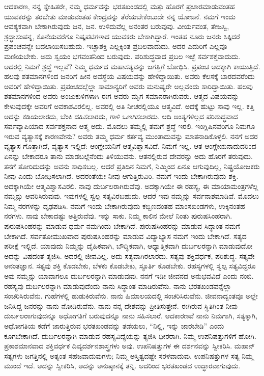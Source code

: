 ಆದಕಾರಣ, ನನ್ನ ಸ್ನೇಹಿತರೇ, ನಮ್ಮ ಧರ್ಮವನ್ನು ಭರತಖಂಡದಲ್ಲಿ ಮತ್ತು ಹೊರಗೆ ಪ್ರಚಾರಮಾಡುವಂತಹ ಯುವಕರನ್ನು ತರಬೇತು ಮಾಡುವಂತಹ ಕೇಂದ್ರವನ್ನು ತೆರೆಯಬೇಕೆಂಬುದೇ ನನ್ನ ಯೋಜನೆ. ನಮಗೆ ಇಂದು ಆವಶ್ಯಕವಾಗಿ ಬೇಕಾಗಿರುವುದು ಜನ, ಜನ. ಉಳಿದುವೆಲ್ಲ ಅನಂತರ ಬರುವುವು. ವೀರ್ಯವಂತ​, ತೇಜಸ್ವಿ, ಶ್ರದ್ಧಾಸಂಪನ್ನ, ಕೊನೆಯವರೆಗೂ ನಿಷ್ಕಪಟಿಗಳಾದ ಯುವಕರು ಬೇಕಾಗಿದ್ದಾರೆ. ಇಂತಹ ನೂರು ಜನರು ಸಿಕ್ಕಿದರೆ ಪ್ರಪಂಚವನ್ನೇ ಬದಲಾಯಿಸಬಹುದು. ಇಚ್ಛಾಶಕ್ತಿ ಎಲ್ಲಕ್ಕಿಂತ ಪ್ರಬಲವಾದುದು. ಅದರ ಎದುರಿಗೆ ಎಲ್ಲವೂ ಮಣಿಯಬೇಕು. ಅದು ಸ್ವಯಂ ಭಗವಂತನಿಂದ ಬರುವುದು. ಪರಿಶುದ್ಧವಾದ ಪ್ರಬಲ ಇಚ್ಛೆ ಸರ್ವಶಕ್ತವಾದುದು. ಅದರಲ್ಲಿ ನಿಮಗೆ ಶ್ರದ್ಧೆ ಇಲ್ಲವೆ? ನಿಮ್ಮ ಧರ್ಮದ ಮಹಾಸತ್ಯವನ್ನು ಜಗತ್ತಿಗೆ ಬೋಧಿಸಿ. ಪ್ರಪಂಚ ಅದಕ್ಕಾಗಿ ಕಾಯುತ್ತಿದೆ. ಹಲವು ಶತಮಾನಗಳಿಂದ ಜನರಿಗೆ ಹೀನ ಅವಸ್ಥೆಯ ವಿಷಯವನ್ನು ಹೇಳಿದ್ದಾಯಿತು. ಅವರು ಕೆಲಸಕ್ಕೆ ಬಾರದವರೆಂದು ಅವರಿಗೆ ಹೇಳಿದ್ದಾಯಿತು. ಪ್ರಪಂಚದಲ್ಲೆಲ್ಲಾ ಸಾಮಾನ್ಯರಿಗೆ ಅವರು ಮನುಷ್ಯರೇ ಅಲ್ಲವೆಂದು ಸಾರಿದ್ದಾಯಿತು. ಹಲವು ಶತಮಾನಗಳಿಂದ ಅವರು ಅಂಜುಕುಳಿಗಳಾಗಿ ಈಗ ಅವರು ಮೃಗ ಸಮಾನರಾಗಿರುವರು. ಆತ್ಮದ ವಿಷಯವನ್ನು ಕೇಳುವುದಕ್ಕೇ ಅವರಿಗೆ ಅವಕಾಶವಿರಲಿಲ್ಲ. ಅವರಲ್ಲಿ ಅತಿ ನೀಚರಲ್ಲಿಯೂ ಆತ್ಮವಿದೆ. ಅದಕ್ಕೆ ಹುಟ್ಟು ಸಾವು ಇಲ್ಲ. ಕತ್ತಿ ಅದನ್ನು ಕಡಿಯಲಾರದು, ಬೆಂಕಿ ದಹಿಸಲಾರದು, ಗಾಳಿ ಒಣಗಿಸಲಾರದು. ಆದಿ ಅಂತ್ಯಗಳಿಲ್ಲದ ಪರಿಶುದ್ಧವಾದ ಸರ್ವವ್ಯಾಪಿಯಾದ ಸರ್ವಶಕ್ತನಾದ ಆತ್ಮ ಅದು. ಮೊದಲು ತಮ್ಮಲ್ಲಿ ತಮಗೆ ಶ್ರದ್ಧೆ ಇರಲಿ. ಇಂಗ್ಲಿಷಿನವರಿಗೂ ನಿಮಗೂ ಇರುವ ವ್ಯತ್ಯಾಸಕ್ಕೆ ಕಾರಣವೇನು? ಅವರು ತಮ್ಮ ಧರ್ಮ ಕರ್ತವ್ಯ ಮುಂತಾದುವನ್ನು ಮಾತನಾಡಿಕೊಳ್ಳಲಿ. ನನಗೆ ಅದರ ವ್ಯತ್ಯಾಸ ಗೊತ್ತಾಗಿದೆ, ವ್ಯತ್ಯಾಸ ಇಲ್ಲಿದೆ: ಆಂಗ್ಲೇಯನಿಗೆ ಆತ್ಮವಿಶ್ವಾಸವಿದೆ. ನಿಮಗೆ ಇಲ್ಲ. ಆತ ಆಂಗ್ಲೇಯನಾದುದರಿಂದ ಏನನ್ನು ಬೇಕಾದರೂ ತಾನು ಮಾಡಬಲ್ಲೆನೆಂದು ತಿಳಿಯುವನು. ಆತನಲ್ಲಿರುವ ದೇವರನ್ನು ಅದು ಹೊರಗೆ ತರುವುದು. ತನಗೆ ತೋರಿದುದನ್ನು ಅವನು ಸಾಧಿಸಬಲ್ಲ. ಆದರೆ ಪ್ರತಿದಿನ ನಿಮಗೆ, ನಿಮ್ಮಿಂದ ಏನೂ ಆಗುವುದಿಲ್ಲ, ನಿಷ್ಪ್ರಯೋಜಕರು ನೀವು ಎಂದು ಬೋಧಿಸಲಾಗಿದೆ. ಅದರಂತೆಯೇ ನೀವು ಆಗುತ್ತಿರುವಿರಿ. ನಮಗೆ ಇಂದು ಬೇಕಾಗಿರುವುದು ಶಕ್ತಿ. ಅದಕ್ಕಾಗಿಯೇ ಆತ್ಮವಿಶ್ವಾಸವಿರಲಿ. ನಾವು ದುರ್ಬಲರಾಗಿರುವೆವು. ಅದಕ್ಕಾಗಿಯೇ ಈ ರಹಸ್ಯ, ಈ ಮಾಯಾಮಂತ್ರಗಳೆಲ್ಲ ನಮ್ಮನ್ನು ಆವರಿಸಿರುವುವು. ಇವುಗಳಲ್ಲಿ ಸ್ವಲ್ಪ ಸತ್ಯವಿರಬಹುದು. ಆದರೆ ಇವು ನಮ್ಮನ್ನು ಸರ್ವನಾಶಮಾಡಿವೆ. ಮೊದಲು ನಿಮ್ಮ ನರಗಳನ್ನು ದೃಢಪಡಿಸಿ. ನಮಗೆ ಇಂದು ಬೇಕಾಗಿರುವುದು ಕಬ್ಬಿಣದಂತಹ ಮಾಂಸಖಂಡಗಳು, ಉಕ್ಕಿನಂತಹ ನರಗಳು. ನಾವು ಬೇಕಾದಷ್ಟು ಅತ್ತಿರುವೆವು. ಇನ್ನು ಸಾಕು. ನಿಮ್ಮ ಕಾಲಿನ ಮೇಲೆ ನಿಂತು ಪುರುಷಸಿಂಹರಾಗಿ. ಪುರುಷಸಿಂಹರನ್ನು ಮಾಡುವ ಧರ್ಮ ನಮಗಿಂದು ಬೇಕಾಗಿದೆ. ಪುರುಷಸಿಂಹರನ್ನು ಮಾಡುವ ಸಿದ್ಧಾಂತ ನಮಗೆ ಬೇಕಾಗಿದೆ. ಸರ್ವತೋಮುಖವಾದ ಪುರುಷಸಿಂಹರನ್ನು ಮಾಡುವ ವಿದ್ಯಾಭ್ಯಾಸ ನಮಗೆ ಇಂದು ಬೇಕಾಗಿದೆ. ಸತ್ಯದ ಪರೀಕ್ಷೆ ಇಲ್ಲಿದೆ. ಯಾವುದು ನಿಮ್ಮನ್ನು ದೈಹಿಕವಾಗಿ, ಬೌದ್ಧಿಕವಾಗಿ, ಆಧ್ಯಾತ್ಮಿಕವಾಗಿ ದುರ್ಬಲರನ್ನಾಗಿ ಮಾಡುವುದೋ ಅದನ್ನು ವಿಷದಂತೆ ತ್ಯಜಿಸಿ. ಅದರಲ್ಲಿ ಜೀವವಿಲ್ಲ. ಅದು ಸತ್ಯವಾಗಿರಲಾರದು. ಸತ್ಯವು ಶಕ್ತಿವರ್ಧಕ, ಪರಿಶುದ್ಧ. ಸತ್ಯವೇ ಅನಂತಜ್ಞಾನ. ಸತ್ಯವು ಶಕ್ತಿ ಕೊಡಬೇಕು, ಬೆಳಕು ಕೊಡಬೇಕು, ಸ್ಫೂರ್ತಿ ಕೊಡಬೇಕು. ರಹಸ್ಯಗಳಲ್ಲಿ ಸ್ವಲ್ಪ ಸತ್ಯವಿದ್ದರೂ ಅವು ನಮ್ಮನ್ನು ಯಾವಾಗಲೂ ದುರ್ಬಲರನ್ನಾಗಿ ಮಾಡುವುವು. ನನಗೆ ಇಡೀ ಜೀವನದ ಅನುಭವವಿದೆ ಎಂದು ನಂಬಿ. ರಹಸ್ಯವು ದುರ್ಬಲರನ್ನಾಗಿ ಮಾಡುವುದೆಂದು ನಾನು ಸಿದ್ಧಾಂತ ಮಾಡಿರುವೆನು. ನಾನು ಭರತಖಂಡವನ್ನೆಲ್ಲಾ ಸಂಚರಿಸಿರುವೆನು. ಗುಹೆಗಳಲ್ಲಿ ಹುಡುಕಿರುವೆನು. ನಾನು ಹಿಮಾಲಯದಲ್ಲಿ ಸಂಚರಿಸಿರುವೆನು. ಜೀವನಾದ್ಯಂತವೂ ಅಲ್ಲೇ ಜನಿಸಿದ್ದ ಜನರನ್ನು ನಾನು ನೋಡಿರುವೆನು. ನಾನು ನನ್ನ ದೇಶವನ್ನು ಪ್ರೀತಿಸುತ್ತೇನೆ. ಈಗಿರುವ ಸ್ಥಿತಿಗಿಂತ ನೀವು ದುರ್ಬಲರಾಗುವುದನ್ನೂ ಅಧೋಗತಿಗೆ ಬರುವುದನ್ನೂ ನಾನು ಸಹಿಸಲಾರೆ. ಆದಕಾರಣವೆ ನಾನು ನಿಮಗಾಗಿ, ಸತ್ಯಕ್ಕಾಗಿ, ಅಧೋಗತಿಯ ಕಡೆಗೆ ಜಾರುತ್ತಿರುವ ಭರತಖಂಡವನ್ನು ತಡೆಯಲು, “ನಿಲ್ಲಿ, ಇನ್ನು ಜಾರಬೇಡಿ” ಎಂದು ಕೂಗಬೇಕಾಗಿದೆ. ದುರ್ಬಲರನ್ನಾಗಿ ಮಾಡುವ ರಹಸ್ಯವಿದ್ಯೆಯನ್ನು ತ್ಯಜಿಸಿ ಧೀರರಾಗಿ. ನಿಮ್ಮ ಉಪನಿಷತ್ತುಗಳಿಗೆ ಹೋಗಿ. ಪ್ರಕಾಶಮಾನವಾದ ಶಕ್ತಿವರ್ಧಕ ದಿವ್ಯದರ್ಶನಶಾಸ್ತ್ರಗಳು ಅವು. ಉಪನಿಷತ್ತುಗಳ ಈ ದರ್ಶನವನ್ನು ಸ್ವೀಕರಿಸಿ. ಮಹಾನ್​ ಸತ್ಯಗಳು ಜಗತ್ತಿನಲ್ಲಿ ಅತ್ಯಂತ ಸಹಜವಾದುವುಗಳು; ನಿಮ್ಮ ಅಸ್ತಿತ್ವದಷ್ಟೇ ಸರಳವಾದುವು. ಉಪನಿಷತ್ತುಗಳ ಸತ್ಯ ನಿಮ್ಮ ಮುಂದೆ ಇದೆ. ಅದನ್ನು ಸ್ವೀಕರಿಸಿ, ಅದನ್ನು ಅನುಷ್ಠಾನಕ್ಕೆ ತನ್ನಿ. ಅದರಿಂದ ಭರತಖಂಡದ ಉದ್ಧಾರವಾಗುವುದು.

